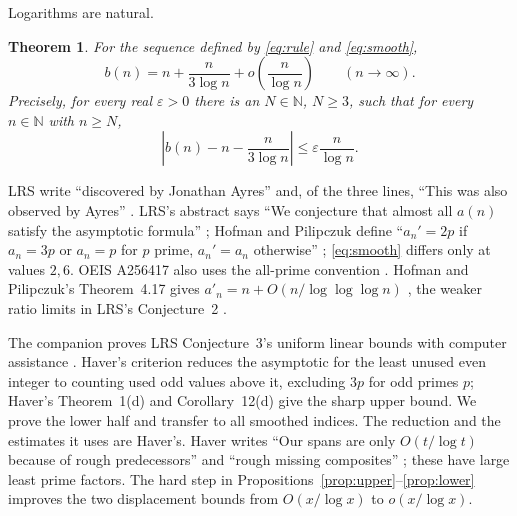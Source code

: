 \documentclass[11pt]{article}
\newtheorem{theorem}{Theorem}
\theoremstyle{remark}
\newcommand{\N}{\mathbb{N}}
\newcommand{\eps}{\varepsilon}
\begin{document}
Logarithms are natural.

\begin{theorem}\label{thm:main}
For the sequence defined by \eqref{eq:rule} and \eqref{eq:smooth},
\[
 b(n)=n+\frac{n}{3\log n}+o\!\left(\frac{n}{\log n}\right)
 \qquad(n\longrightarrow\infty).
\]
Precisely, for every real $\eps>0$ there is an $N\in\N$, $N\geq3$,
such that for every $n\in\N$ with $n\geq N$,
\begin{equation}\label{eq:epsilon}
 \left|b(n)-n-\frac{n}{3\log n}\right|
       \leq \eps\frac{n}{\log n}.
\end{equation}
\end{theorem}


LRS write ``discovered by Jonathan Ayres''
\cite[Section~1, first paragraph]{lrs} and, of the three lines,
``This was also observed by Ayres'' \cite[Section~4]{lrs}. LRS's abstract says ``We conjecture that almost
all $a(n)$ satisfy the asymptotic formula'' \cite[abstract]{lrs};
Hofman and Pilipczuk define ``$a_n'=2p$ if $a_n=3p$ or $a_n=p$ for $p$ prime,
$a_n'=a_n$ otherwise'' \cite[Section~1]{hp}; \eqref{eq:smooth} differs only at values $2,6$.
OEIS A256417 also uses the all-prime convention \cite[A256417]{oeis}.
Hofman and Pilipczuk's Theorem~4.17 gives $a'_n=n+O(n/\log\log\log n)$
\cite{hp}, the weaker ratio limits in LRS's Conjecture~2
\cite{lrs}.

The companion proves LRS Conjecture~3's uniform linear bounds with
computer assistance \cite[Theorem~1]{ekgbounds}.
Haver's criterion \cite[Corollary~2(e)]{haver} reduces the
asymptotic for the least unused even integer to counting used odd values
above it, excluding $3p$ for odd primes $p$; Haver's Theorem~1(d) and
Corollary~12(d) give the sharp upper bound. We prove the lower half and transfer to all smoothed indices.
The reduction and the estimates it uses are Haver's.
Haver writes ``Our spans are only $O(t/\log t)$ because of rough predecessors''
and ``rough missing composites'' \cite[remark after Corollary~12]{haver};
these have large least prime factors.
The hard step in Propositions~\ref{prop:upper}--\ref{prop:lower} improves
the two displacement bounds from $O(x/\log x)$ to $o(x/\log x)$.
\end{document}
